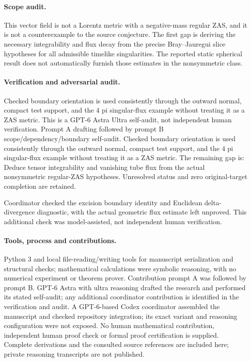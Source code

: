 \documentclass[11pt]{article}
\begin{document}
\paragraph{Scope audit.} This vector field is not a Lorentz metric with a negative-mass regular ZAS, and it is not a counterexample to the source conjecture. The first gap is deriving the necessary integrability and flux decay from the precise Bray--Jauregui slice hypotheses for all admissible timelike singularities. The reported static spherical result does not automatically furnish those estimates in the nonsymmetric class.

\paragraph{Verification and adversarial audit.}
Checked boundary orientation is used consistently through the outward normal, compact test support, and the 4 pi singular-flux example without treating it as a ZAS metric. This is a GPT-6 Astra Ultra self-audit, not independent human verification. Prompt A drafting followed by prompt B scope/dependency/boundary self-audit. Checked boundary orientation is used consistently through the outward normal, compact test support, and the 4 pi singular-flux example without treating it as a ZAS metric. The remaining gap is: Deduce tensor integrability and vanishing tube flux from the actual nonsymmetric regular-ZAS hypotheses. Unresolved status and zero original-target completion are retained.

Coordinator checked the excision boundary identity and Euclidean delta-divergence diagnostic, with the actual geometric flux estimate left unproved. This additional check was model-assisted, not independent human verification.

\paragraph{Tools, process and contributions.}
Python 3 and local file-reading/writing tools for manuscript serialization and structural checks; mathematical calculations were symbolic reasoning, with no numerical experiment or theorem prover. Contribution prompt A was followed by prompt B. GPT-6 Astra with ultra reasoning drafted the research and performed its stated self-audit; any additional coordinator contribution is identified in the verification and audit. A GPT-6-based Codex coordinator assembled the manuscript and checked repository integration; its exact variant and reasoning configuration were not exposed. No human mathematical contribution, independent human proof check or formal proof certification is supplied. Complete derivations and the consulted source references are included here; private reasoning transcripts are not published.
\end{document}
